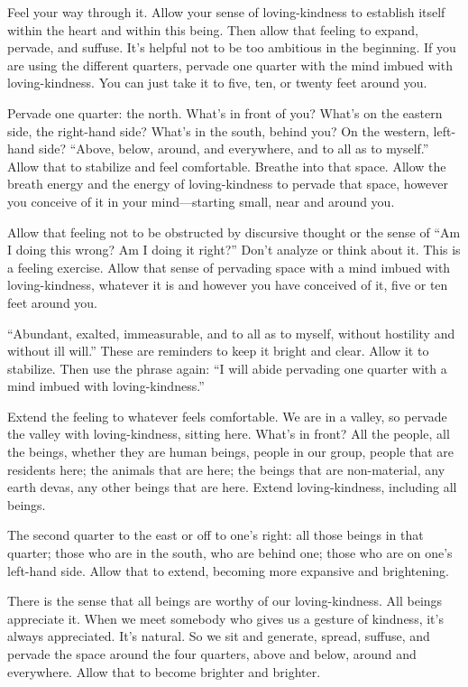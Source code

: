 Feel your way through it. Allow your sense of loving-kindness to
establish itself within the heart and within this being. Then allow that
feeling to expand, pervade, and suffuse. It’s helpful not to be too
ambitious in the beginning. If you are using the different quarters,
pervade one quarter with the mind imbued with loving-kindness. You can
just take it to five, ten, or twenty feet around you.

Pervade one quarter: the north. What’s in front of you? What’s on the
eastern side, the right-hand side? What’s in the south, behind you? On
the western, left-hand side? “Above, below, around, and everywhere, and
to all as to myself.” Allow that to stabilize and feel comfortable.
Breathe into that space. Allow the breath energy and the energy of
loving-kindness to pervade that space, however you conceive of it in
your mind—starting small, near and around you.

Allow that feeling not to be obstructed by discursive thought or the
sense of “Am I doing this wrong? Am I doing it right?” Don’t analyze or
think about it. This is a feeling exercise. Allow that sense of
pervading space with a mind imbued with loving-kindness, whatever it is
and however you have conceived of it, five or ten feet around you.

“Abundant, exalted, immeasurable, and to all as to myself, without
hostility and without ill will.” These are reminders to keep it bright
and clear. Allow it to stabilize. Then use the phrase again: “I will
abide pervading one quarter with a mind imbued with loving-kindness.”

Extend the feeling to whatever feels comfortable. We are in a valley, so
pervade the valley with loving-kindness, sitting here. What’s in front?
All the people, all the beings, whether they are human beings, people in
our group, people that are residents here; the animals that are here;
the beings that are non-material, any earth devas, any other beings that
are here. Extend loving-kindness, including all beings.

The second quarter to the east or off to one’s right: all those beings
in that quarter; those who are in the south, who are behind one; those
who are on one’s left-hand side. Allow that to extend, becoming more
expansive and brightening.

There is the sense that all beings are worthy of our loving-kindness.
All beings appreciate it. When we meet somebody who gives us a gesture
of kindness, it’s always appreciated. It’s natural. So we sit and
generate, spread, suffuse, and pervade the space around the four
quarters, above and below, around and everywhere. Allow that to become
brighter and brighter.

